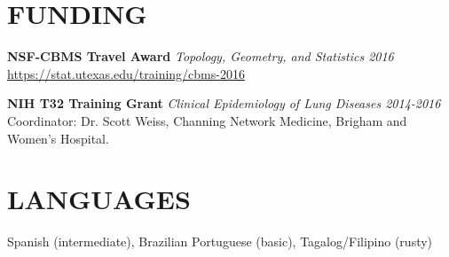 \documentclass[line, margin]{res}
\begin{document}
\begin{resume}

\section{FUNDING}

\textbf{NSF-CBMS Travel Award} \textit{Topology, Geometry, and Statistics \hfill 2016} \\
\url{https://stat.utexas.edu/training/cbms-2016}

\textbf{NIH T32 Training Grant} \textit{Clinical Epidemiology of Lung Diseases \hfill 2014-2016} \\
Coordinator: Dr. Scott Weiss, Channing Network Medicine, Brigham and Women's Hospital.

\section{LANGUAGES}
Spanish (intermediate), Brazilian Portuguese (basic), Tagalog/Filipino (rusty)



\end{resume}
\end{document}
